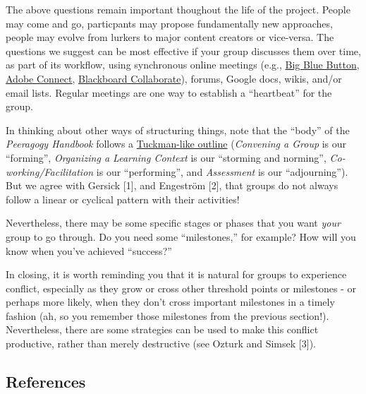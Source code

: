 The above questions remain important thoughout the life of the project.
People may come and go, particpants may propose fundamentally new
approaches, people may evolve from lurkers to major content creators or
vice-versa. The questions we suggest can be most effective if your group
discusses them over time, as part of its workflow, using synchronous
online meetings (e.g., \href{http://www.bigbluebutton.org/}{Big Blue
Button},
\href{http://success.adobe.com/en/na/sem/products/connect/1109_6011_connect_webinars.html?sdid=IEASO\&skwcid=TC/textbar\%7B\%7D22191/textbar\%7B\%7Dadobe\%20connect/textbar\%7B\%7D/textbar\%7B\%7DS/textbar\%7B\%7De/textbar\%7B\%7D5894715262}{Adobe
Connect},
\href{http://www.blackboard.com/platforms/collaborate/overview.aspx}{Blackboard
Collaborate}), forums, Google docs, wikis, and/or email lists. Regular
meetings are one way to establish a ``heartbeat'' for the group.

In thinking about other ways of structuring things, note that the
``body'' of the \emph{Peeragogy Handbook} follows a
\href{http://en.wikipedia.org/wiki/Forming-storming-norming-performing}{Tuckman-like
outline} (\emph{Convening a Group} is our ``forming'', \emph{Organizing
a Learning Context} is our ``storming and norming'',
\emph{Co-working/Facilitation} is our ``performing'', and
\emph{Assessment} is our ``adjourning''). But we agree with Gersick
{{[}1{]}}, and Engeström {{[}2{]}}, that groups do not always follow a
linear or cyclical pattern with their activities!

Nevertheless, there may be some specific stages or phases that you want
\emph{your} group to go through. Do you need some ``milestones,'' for
example? How will you know when you've achieved ``success?''

In closing, it is worth reminding you that it is natural for groups to
experience conflict, especially as they grow or cross other threshold
points or milestones - or perhaps more likely, when they don't cross
important milestones in a timely fashion (ah, so you remember those
milestones from the previous section!). Nevertheless, there are some
strategies can be used to make this conflict productive, rather than
merely destructive (see Ozturk and Simsek {{[}3{]}}).

\hypertarget{references}{%
\subsection{References}\label{references}}

